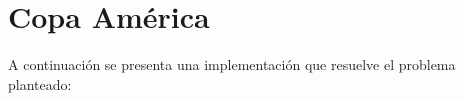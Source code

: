 \section{Copa América}

A continuación se presenta una implementación que resuelve el problema planteado:
  

